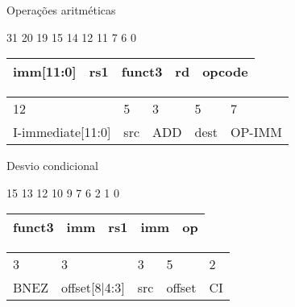     \begin{frame}{Operações aritméticas}

        \begin{center}

            \begin{flushleft}
                \footnotesize
                31 \hspace{2.95cm} 20 19 \hspace{1.52cm} 15 14 \hspace{1.50cm} 12 11 \hspace{1.70cm} 7 6 \hspace{2cm} 0
                \normalsize
            \end{flushleft}
            
            \begin{tabular}{ | p{3cm} | p{2cm} | p{2cm} | p{2cm} | p{2cm} | }
                \hline
                imm[11:0] & rs1 & funct3 & rd & opcode \\
                \hline
            \end{tabular}
            \begin{tabular}{p{3cm} p{2cm} p{2cm} p{2cm} p{2cm}}
             12 & 5 & 3 & 5 & 7 \\ 
             I-immediate[11:0] & src & ADD & dest & OP-IMM 
            \end{tabular}

        \end{center}

    \end{frame}

    \begin{frame}{Desvio condicional}

        \begin{center}

            \begin{flushleft}
                \footnotesize
                \hspace{0.5cm} 15 \hspace{2.85cm} 13 12 \hspace{1.52cm} 10 9 \hspace{1.85cm} 7 6 \hspace{1.9cm} 2 1 \hspace{1cm} 0
                \normalsize
            \end{flushleft}
            
            \begin{tabular}{ | p{2.95cm} | p{2cm} | p{2cm} | p{2cm} | p{1cm} | }
                \hline
                funct3 & imm & rs1 & imm & op \\
                \hline
            \end{tabular}
            \begin{tabular}{p{2.95cm} p{2cm} p{2cm} p{2cm} p{1cm}}
             3 & 3 & 3 & 5 & 2 \\ 
             BNEZ & offset[8|4:3] & src & offset & CI 
            \end{tabular}

        \end{center}

    \end{frame}